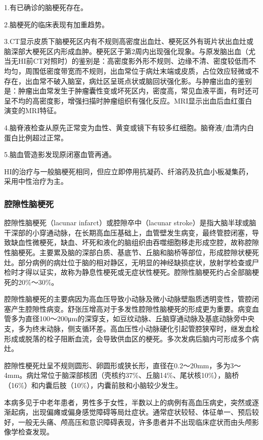 1.有已确诊的脑梗死存在。

2.脑梗死的临床表现有加重趋势。

3.CT显示皮质下脑梗死区内有不规则高密度出血灶、梗死区外有斑片状出血灶或脑深部大梗死区内形成血肿。梗死区于第2周内出现强化现象。与原发脑出血（尤当无HI前CT对照时）的鉴别是：高密度影外形不规则、边缘不清、密度较低而不均匀，周围低密度带宽而不规则，出血常位于病灶末端或皮质，占位效应轻微或不存在，出血常不破入脑室，病灶区呈斑点状或脑回状强化影。与肿瘤出血的鉴别是：肿瘤出血常发生于肿瘤囊性变或坏死区内，密度高，常见血液平面，有时还可呈不均的高密度影，增强扫描时肿瘤组织有强化反应。MRI显示出血后血红蛋白演变的MRI特征。

4.脑脊液检查从原先正常变为血性、黄变或镜下有较多红细胞。脑脊液/血清内白蛋白比例超过正常。

5.脑血管造影发现原闭塞血管再通。

HI的治疗与一般脑梗死相同，但应立即停用抗凝药、纤溶药及抗血小板凝集药，采用中性治疗为主。

\subsubsection{腔隙性脑梗死}

腔隙性脑梗死（lacunar infarct）或腔隙卒中（lacunar
stroke）是指大脑半球或脑干深部的小穿通动脉，在长期高血压基础上，血管壁发生病变，最终管腔闭塞，导致缺血性微梗死，缺血、坏死和液化的脑组织由吞噬细胞移走形成空腔，故称腔隙性脑梗死。主要累及脑的深部白质、基底节、丘脑和脑桥等部位，形成腔隙状梗死灶。部分病例的病灶位于脑的相对静区，无明显的神经缺损症状，放射学检查或尸检时才得以证实，故称为静息性梗死或无症状性梗死。腔隙性脑梗死约占全部脑梗死的20\%～30\%。

腔隙性脑梗死的主要病因为高血压导致小动脉及微小动脉壁脂质透明变性，管腔闭塞产生腔隙性病变。舒张压增高对于多发性腔隙性脑梗死的形成更为重要。病变血管多为直径100～200μm的深穿支，如豆纹动脉、丘脑穿通动脉及基底动脉旁中央支，多为终末动脉，侧支循环差。高血压性小动脉硬化引起管腔狭窄时，继发血栓形成或脱落的栓子阻断血流，会导致供血区的梗死。多次发病后脑内可形成多个病灶。

腔隙性梗死灶呈不规则圆形、卵圆形或狭长形，直径在0.2～20mm，多为3～4mm。病灶常位于脑深部核团（壳核约37\%、丘脑14\%、尾状核10\%），脑桥（16\%）和内囊后肢（10\%），内囊前肢和小脑较少发生。

本病多见于中老年患者，男性多于女性，半数以上的病例有高血压病史，突然或逐渐起病，出现偏瘫或偏身感觉障碍等局灶症状。通常症状较轻、体征单一、预后较好，一般无头痛、颅高压和意识障碍表现，许多患者并不出现临床症状而由头颅影像学检查发现。

